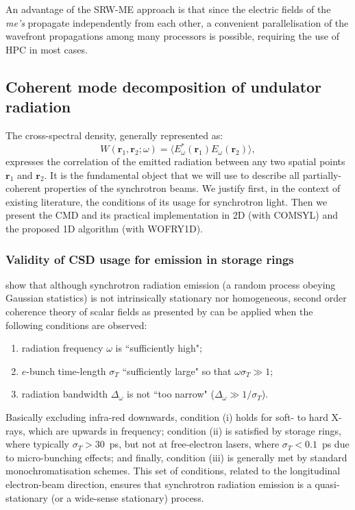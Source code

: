 \documentclass{iucr}              %
\begin{document}
An advantage of the SRW-ME approach is that since the electric fields of the \textit{me's} propagate independently from each other, a convenient parallelisation of the wavefront propagations among many processors is possible, requiring the use of HPC in most cases.
\subsection{Coherent mode decomposition of undulator radiation}\label{sec:CMD}

The cross-spectral density, generally represented as:
\begin{equation}
W(\textbf{r}_1,\textbf{r}_2;\omega) = \big\langle E^*_{\omega}(\textbf{r}_1)  E_{\omega}(\textbf{r}_2)\big\rangle,
\label{eq:CSD_2D}
\end{equation}
expresses the correlation of the emitted radiation between any two spatial points $\textbf{r}_1$ and $\textbf{r}_2$. It is the fundamental object that we will use to describe all partially-coherent properties of the synchrotron beams. We justify first, in the context of existing literature, the conditions of its usage for synchrotron light. Then we present the CMD and its practical implementation in 2D (with COMSYL) and the proposed 1D algorithm (with WOFRY1D).


\subsubsection{Validity of CSD usage for emission in storage rings\\}\label{sec:validity}

 show that although synchrotron radiation emission (a random process obeying Gaussian statistics) is not intrinsically stationary nor homogeneous, second order coherence theory of scalar fields as presented by  can be applied when the following conditions are observed:
\begin{enumerate}[label=(\roman*)]
\item radiation frequency $\omega$ is ``sufficiently high";
\item $e$-bunch time-length $\sigma_{T}$ ``sufficiently large" so that $\omega\sigma_{T}\gg1$;
\item radiation bandwidth $\Delta_\omega$ is not ``too narrow" ($\Delta_\omega\gg1\big/\sigma_{T}$).
\end{enumerate}
Basically excluding infra-red downwards, condition (i) holds for soft- to hard X-rays, which are upwards in frequency; condition (ii) is satisfied by storage rings, where typically $\sigma_{T}>30$~ps, but not at free-electron lasers, where $\sigma_{T}<0.1$~ps due to micro-bunching effects; and finally, condition (iii) is generally met by standard monochromatisation schemes. This set of conditions, related to the longitudinal electron-beam direction, ensures that synchrotron radiation emission is a quasi-stationary (or a wide-sense stationary) process. 
\end{document}
